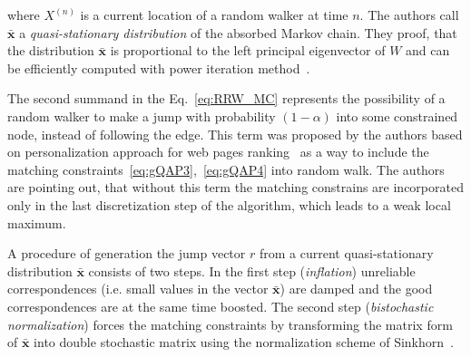 where $X^{(n)}$ is a current location of a random walker at time $n$. The authors call $\mathbf{\bar{x}}$ a \emph{quasi-stationary distribution} of the absorbed Markov chain. They proof, that the distribution $\mathbf{\bar{x}}$ is proportional to the left principal eigenvector of $W$ and can be efficiently computed with power iteration method~\cite{PowerIteration}.

The second summand in the Eq.~\ref{eq:RRW_MC} represents the possibility of a random walker to make a jump with probability $(1-\alpha)$ into some constrained node, instead of following the edge. This term was proposed by the authors based on personalization approach for web pages ranking~\cite{Langville2003} as a way to include the matching constraints~\eqref{eq:gQAP3},~\eqref{eq:gQAP4} into random walk. The authors are pointing out, that without this term the matching constrains are incorporated only in the last discretization step of the algorithm, which leads to a weak local maximum. 

A procedure of generation the jump vector $r$ from a current quasi-stationary distribution $\mathbf{\bar{x}}$ consists of two steps. In the first step (\emph{inflation}) unreliable correspondences (i.e. small values in the vector $\mathbf{\bar{x}}$) are damped and the good correspondences are at the same time boosted. The second step (\emph{bistochastic normalization}) forces the matching constraints by transforming the matrix form of $\mathbf{\bar{x}}$ into double stochastic matrix using the normalization scheme of Sinkhorn~\cite{Sinkhorn1964}. 

